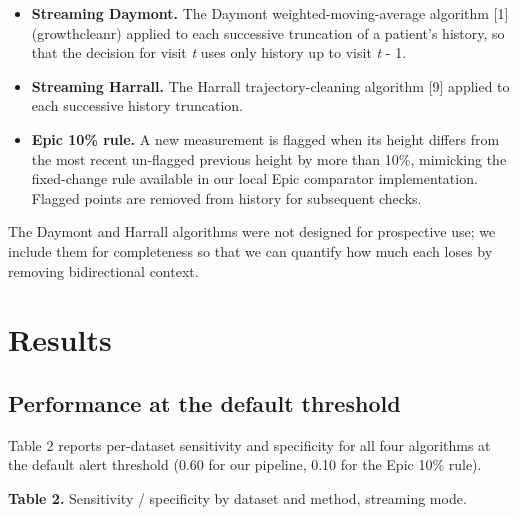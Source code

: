 \documentclass[11pt]{article}
\begin{document}
\begin{itemize}
\item
  \textbf{Streaming Daymont.} The Daymont weighted-moving-average algorithm [1] (growthcleanr) applied to each successive truncation of a patient's history, so that the decision for visit \emph{t} uses only history up to visit \emph{t} - 1.
\item
  \textbf{Streaming Harrall.} The Harrall trajectory-cleaning algorithm [9] applied to each successive history truncation.
\item
  \textbf{Epic 10\% rule.} A new measurement is flagged when its height differs from the most recent un-flagged previous height by more than 10\%, mimicking the fixed-change rule available in our local Epic comparator implementation. Flagged points are removed from history for subsequent checks.
\end{itemize}

The Daymont and Harrall algorithms were not designed for prospective use; we include them for completeness so that we can quantify how much each loses by removing bidirectional context.

\section{Results}\label{results}

\subsection{Performance at the default threshold}\label{performance-at-the-default-threshold}

Table 2 reports per-dataset sensitivity and specificity for all four algorithms at the default alert threshold (0.60 for our pipeline, 0.10 for the Epic 10\% rule).

\textbf{Table 2.} Sensitivity / specificity by dataset and method, streaming mode.
\end{document}
